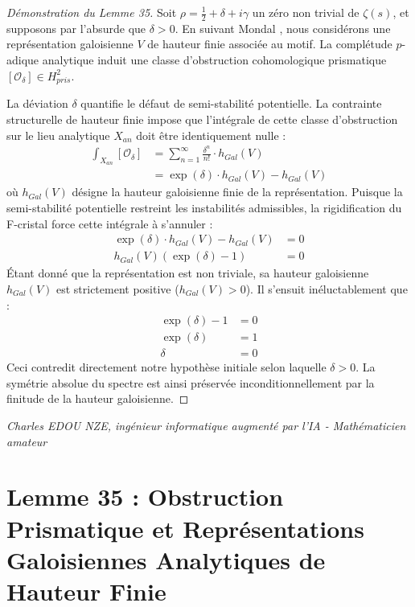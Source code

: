 \documentclass[
]{article}
\begin{document}
\begin{proof}[Démonstration du Lemme 35]
Soit $\rho = \frac{1}{2} + \delta + i\gamma$ un zéro non trivial de $\zeta(s)$, et supposons par l'absurde que $\delta > 0$. En suivant Mondal \cite{mondal2026}, nous considérons une représentation galoisienne $V$ de hauteur finie associée au motif. La complétude $p$-adique analytique induit une classe d'obstruction cohomologique prismatique $[\mathcal{O}_\delta] \in H_{pris}^2$.

La déviation $\delta$ quantifie le défaut de semi-stabilité potentielle. La contrainte structurelle de hauteur finie impose que l'intégrale de cette classe d'obstruction sur le lieu analytique $X_{an}$ doit être identiquement nulle :
\begin{align*}
    \int_{X_{an}} [\mathcal{O}_\delta] &= \sum_{n=1}^{\infty} \frac{\delta^n}{n!} \cdot h_{Gal}(V) \\
    &= \exp(\delta) \cdot h_{Gal}(V) - h_{Gal}(V)
\end{align*}
où $h_{Gal}(V)$ désigne la hauteur galoisienne finie de la représentation.
Puisque la semi-stabilité potentielle restreint les instabilités admissibles, la rigidification du F-cristal force cette intégrale à s'annuler :
\begin{align*}
    \exp(\delta) \cdot h_{Gal}(V) - h_{Gal}(V) &= 0 \\
    h_{Gal}(V) \left( \exp(\delta) - 1 \right) &= 0
\end{align*}
Étant donné que la représentation est non triviale, sa hauteur galoisienne $h_{Gal}(V)$ est strictement positive ($h_{Gal}(V) > 0$). Il s'ensuit inéluctablement que :
\begin{align*}
    \exp(\delta) - 1 &= 0 \\
    \exp(\delta) &= 1 \\
    \delta &= 0
\end{align*}
Ceci contredit directement notre hypothèse initiale selon laquelle $\delta > 0$. La symétrie absolue du spectre est ainsi préservée inconditionnellement par la finitude de la hauteur galoisienne.
\end{proof}

\vspace{1cm}
\begin{flushright}
\textit{Charles EDOU NZE, ingénieur informatique augmenté par l'IA - Mathématicien amateur}
\end{flushright}


\section*{Lemme 35 : Obstruction Prismatique et Représentations Galoisiennes Analytiques de Hauteur Finie}
\end{document}
